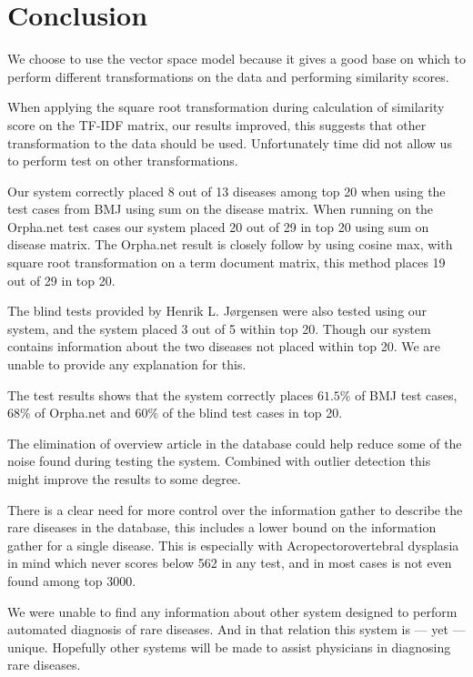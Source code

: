 \chapter{Conclusion}

We choose to use the vector space model because it gives a good base
on which to perform different transformations on the data and performing
similarity scores.

When applying the square root transformation during calculation of
similarity score on the TF-IDF matrix, our results improved, this
suggests that other transformation to the data should be
used. Unfortunately time did not allow us to perform test on other
transformations.

Our system correctly placed 8 out of 13 diseases among top 20 when
using the test cases from BMJ using sum on the disease matrix. When
running on the Orpha.net test cases our system placed 20 out of 29 in
top 20 using sum on disease matrix. The Orpha.net result is closely
follow by using cosine max, with square root transformation on a term
document matrix, this method places 19 out of 29 in top 20.

The blind tests provided by Henrik L. J\o rgensen were also tested
using our system, and the system placed 3 out of 5 within top
20. Though our system contains information about the two diseases not
placed within top 20. We are unable to provide any explanation for
this.

The test results shows that the system correctly places $61.5\%$ of
BMJ test cases, $68\%$ of Orpha.net and $60\%$ of the blind test cases
in top 20.

The elimination of overview article in the database could help reduce
some of the noise found during testing the system. Combined with
outlier detection this might improve the results to some degree.

There is a clear need for more control over the information gather to
describe the rare diseases in the database, this includes a lower
bound on the information gather for a single disease. This is
especially with Acropectorovertebral dysplasia in mind which never
scores below 562 in any test, and in most cases is not even found
among top 3000.

We were unable to find any information about other system designed to
perform automated diagnosis of rare diseases. And in that relation
this system is --- yet --- unique. Hopefully other systems will be
made to assist physicians in diagnosing rare diseases.

